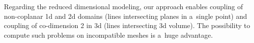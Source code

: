 Regarding the reduced dimensional modeling, our approach enables coupling of non-coplanar 1d and 2d domains
(lines intersecting planes in a~single point) and coupling of co-dimension 2 in 3d (lines intersecting 3d volume).
The possibility to compute such problems on incompatible meshes is a~huge advantage.

